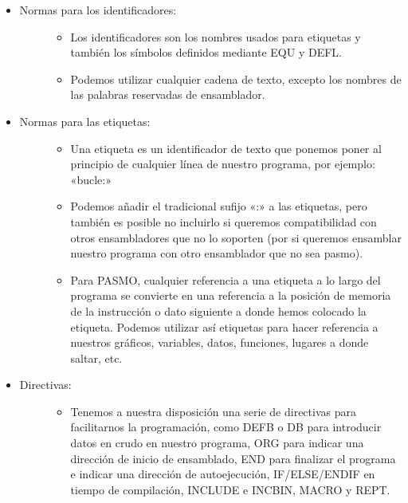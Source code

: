 \documentclass[letterpaper,10pt,spanish]{sphinxmanual}
\begin{document}
\begin{itemize}
\begin{description}
\begin{itemize}
\end{itemize}

\end{description}

\item {} \begin{description}
\item[{Normas para los identificadores:}] \leavevmode\begin{itemize}
\item {} 
Los identificadores son los nombres usados para etiquetas y también los símbolos definidos mediante EQU y DEFL.

\item {} 
Podemos utilizar cualquier cadena de texto, excepto los nombres de las palabras reservadas de ensamblador.

\end{itemize}

\end{description}

\item {} \begin{description}
\item[{Normas para las etiquetas:}] \leavevmode\begin{itemize}
\item {} 
Una etiqueta es un identificador de texto que ponemos poner al principio de cualquier línea de nuestro programa, por ejemplo: «bucle:»

\item {} 
Podemos añadir el tradicional sufijo «:» a las etiquetas, pero también es posible no incluirlo si queremos compatibilidad con otros ensambladores que no lo soporten (por si queremos ensamblar nuestro programa con otro ensamblador que no sea pasmo).

\item {} 
Para PASMO, cualquier referencia a una etiqueta a lo largo del programa se convierte en una referencia a la posición de memoria de la instrucción o dato siguiente a donde hemos colocado la etiqueta. Podemos utilizar así etiquetas para hacer referencia a nuestros gráficos, variables, datos, funciones, lugares a donde saltar, etc.

\end{itemize}

\end{description}

\item {} \begin{description}
\item[{Directivas:}] \leavevmode\begin{itemize}
\item {} 
Tenemos a nuestra disposición una serie de directivas para facilitarnos la programación, como DEFB o DB para introducir datos en crudo en nuestro programa, ORG para indicar una dirección de inicio de ensamblado, END para finalizar el programa e indicar una dirección de autoejecución, IF/ELSE/ENDIF en tiempo de compilación, INCLUDE e INCBIN, MACRO y REPT.


\end{itemize}
\end{description}
\end{itemize}
\end{document}
